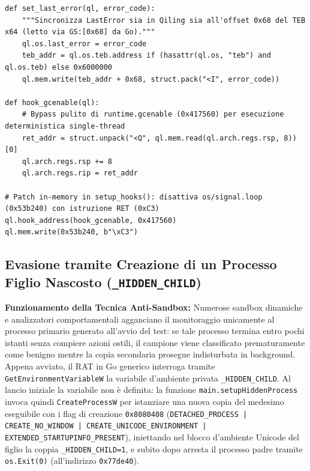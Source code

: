 \documentclass[11pt, a4paper]{article}
\begin{document}
\begin{lstlisting}[style=pythoncode, caption={Adattamento del runtime Go 1.23 a 64 bit e sincronizzazione diretta del LastError nel TEB.}, label={lst:gorat_goruntime}]
def set_last_error(ql, error_code):
    """Sincronizza LastError sia in Qiling sia all'offset 0x68 del TEB x64 (letto via GS:[0x68] da Go)."""
    ql.os.last_error = error_code
    teb_addr = ql.os.teb.address if (hasattr(ql.os, "teb") and ql.os.teb) else 0x6000000
    ql.mem.write(teb_addr + 0x68, struct.pack("<I", error_code))

def hook_gcenable(ql):
    # Bypass pulito di runtime.gcenable (0x417560) per esecuzione deterministica single-thread
    ret_addr = struct.unpack("<Q", ql.mem.read(ql.arch.regs.rsp, 8))[0]
    ql.arch.regs.rsp += 8
    ql.arch.regs.rip = ret_addr

# Patch in-memory in setup_hooks(): disattiva os/signal.loop (0x53b240) con istruzione RET (0xC3)
ql.hook_address(hook_gcenable, 0x417560)
ql.mem.write(0x53b240, b"\xC3")
\end{lstlisting}

\subsection{Evasione tramite Creazione di un Processo Figlio Nascosto (\texttt{\_HIDDEN\_CHILD})}

\textbf{Funzionamento della Tecnica Anti-Sandbox:} Numerose sandbox dinamiche e analizzatori comportamentali agganciano il monitoraggio unicamente al processo primario generato all'avvio del test: se tale processo termina entro pochi istanti senza compiere azioni ostili, il campione viene classificato prematuramente come benigno mentre la copia secondaria prosegue indisturbata in background. Appena avviato, il RAT in Go generico interroga tramite \texttt{Get\allowbreak{}Environment\allowbreak{}VariableW} la variabile d'ambiente privata \texttt{\_\allowbreak{}HIDDEN\_\allowbreak{}CHILD}. Al lancio iniziale la variabile non \`e definita: la funzione \texttt{main.\allowbreak{}setup\allowbreak{}Hidden\allowbreak{}Process} invoca quindi \texttt{Create\allowbreak{}ProcessW} per istanziare una nuova copia del medesimo eseguibile con i flag di creazione \texttt{0x8080408} (\texttt{DETACHED\_\allowbreak{}PROCESS | CREATE\_\allowbreak{}NO\_\allowbreak{}WINDOW | CREATE\_\allowbreak{}UNICODE\_\allowbreak{}ENVIRONMENT | EXTENDED\_\allowbreak{}STARTUPINFO\_\allowbreak{}PRESENT}), iniettando nel blocco d'ambiente Unicode del figlio la coppia \texttt{\_\allowbreak{}HIDDEN\_\allowbreak{}CHILD=1}, e subito dopo arresta il processo padre tramite \texttt{os.Exit(0)} (all'indirizzo \texttt{0x77de40}).
\end{document}
